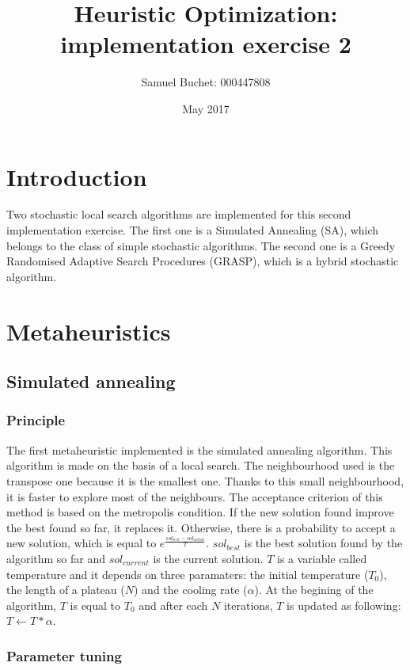 \documentclass{article}
\title{Heuristic Optimization: implementation exercise 2}
\author{Samuel Buchet: 000447808}
\date{May 2017}
\begin{document}
\maketitle

\section{Introduction}

Two stochastic local search algorithms are implemented for this second implementation exercise.
The first one is a Simulated Annealing (SA), which belongs to the class of simple stochastic algorithms.
The second one is a Greedy Randomised Adaptive Search Procedures (GRASP), which is a hybrid stochastic algorithm.

\section{Metaheuristics}

\subsection{Simulated annealing}

\subsubsection{Principle}

The first metaheuristic implemented is the simulated annealing algorithm.
This algorithm is made on the basis of a local search.
The neighbourhood used is the transpose one because it is the smallest one.
Thanks to this small neighbourhood, it is faster to explore most of the neighbours.
The acceptance criterion of this method is based on the metropolis condition.
If the new solution found improve the best found so far, it replaces it. Otherwise, there is a probability to accept a new solution, which is equal to $e^{ \frac{sol_{best}-sol_{actual}}{T}}$.
$sol_{best}$ is the best solution found by the algorithm so far and $sol_{current}$ is the current solution.
$T$ is a variable called temperature and it depends on three paramaters: the initial temperature ($T_0$), the length of a plateau ($N$) and the cooling rate ($\alpha$).
At the begining of the algorithm, $T$ is equal to $T_0$ and after each $N$ iterations, $T$ is updated as following: $T \leftarrow T*\alpha$.

\subsubsection{Parameter tuning}
\end{document}

